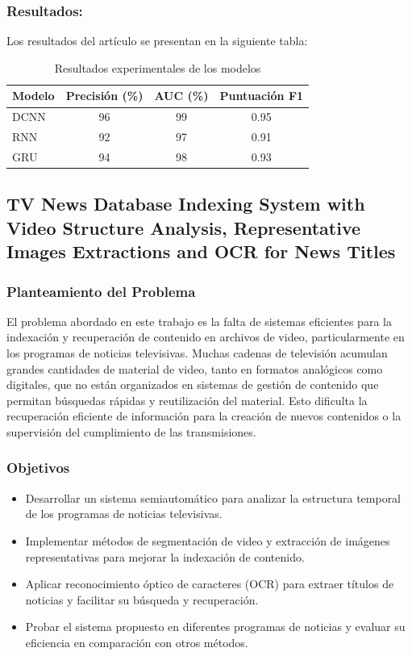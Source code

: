 	\subsubsection{Resultados: }
	Los resultados del artículo se presentan en la siguiente tabla:
	
	\begin{table}[h]
		\centering
		\caption{Resultados experimentales de los modelos}
		\begin{tabular}{lccc}
			\hline
			\textbf{Modelo} & \textbf{Precisión (\%)} & \textbf{AUC (\%)} & \textbf{Puntuación F1} \\
			\hline
			DCNN & 96 & 99 & 0.95 \\
			RNN  & 92 & 97 & 0.91 \\
			GRU  & 94 & 98 & 0.93 \\
			\hline
		\end{tabular}
		\label{table:model_results}
	\end{table}







\subsection{TV News Database Indexing System with Video Structure Analysis, Representative Images Extractions and OCR for News Titles}
\cite{rozsa2022tv}

\subsubsection{Planteamiento del Problema}
El problema abordado en este trabajo es la falta de sistemas eficientes para la indexación y recuperación de contenido en archivos de video, particularmente en los programas de noticias televisivas. Muchas cadenas de televisión acumulan grandes cantidades de material de video, tanto en formatos analógicos como digitales, que no están organizados en sistemas de gestión de contenido que permitan búsquedas rápidas y reutilización del material. Esto dificulta la recuperación eficiente de información para la creación de nuevos contenidos o la supervisión del cumplimiento de las transmisiones.
\subsubsection{Objetivos}
\begin{itemize}
	\item Desarrollar un sistema semiautomático para analizar la estructura temporal de los programas de noticias televisivas.
	\item Implementar métodos de segmentación de video y extracción de imágenes representativas para mejorar la indexación de contenido.
	\item Aplicar reconocimiento óptico de caracteres (OCR) para extraer títulos de noticias y facilitar su búsqueda y recuperación.
	\item Probar el sistema propuesto en diferentes programas de noticias y evaluar su eficiencia en comparación con otros métodos.
\end{itemize}
